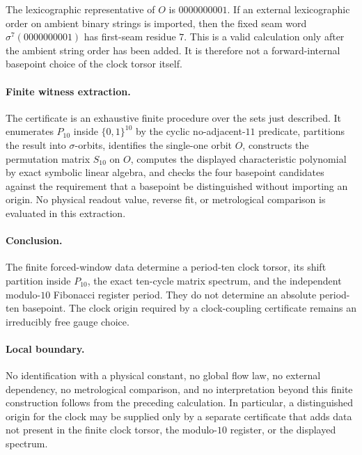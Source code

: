 The lexicographic representative of $O$ is $0000000001$. If an external lexicographic order on ambient binary strings is imported, then the fixed seam word $\sigma^7(0000000001)$ has first-seam residue $7$. This is a valid calculation only after the ambient string order has been added. It is therefore not a forward-internal basepoint choice of the clock torsor itself.

\paragraph{Finite witness extraction.}
The certificate is an exhaustive finite procedure over the sets just described. It enumerates $P_{10}$ inside $\{0,1\}^{10}$ by the cyclic no-adjacent-$11$ predicate, partitions the result into $\sigma$-orbits, identifies the single-one orbit $O$, constructs the permutation matrix $S_{10}$ on $O$, computes the displayed characteristic polynomial by exact symbolic linear algebra, and checks the four basepoint candidates against the requirement that a basepoint be distinguished without importing an origin. No physical readout value, reverse fit, or metrological comparison is evaluated in this extraction.

\paragraph{Conclusion.}
The finite forced-window data determine a period-ten clock torsor, its shift partition inside $P_{10}$, the exact ten-cycle matrix spectrum, and the independent modulo-$10$ Fibonacci register period. They do not determine an absolute period-ten basepoint. The clock origin required by a clock-coupling certificate remains an irreducibly free gauge choice.

\paragraph{Local boundary.}
No identification with a physical constant, no global flow law, no external dependency, no metrological comparison, and no interpretation beyond this finite construction follows from the preceding calculation. In particular, a distinguished origin for the clock may be supplied only by a separate certificate that adds data not present in the finite clock torsor, the modulo-$10$ register, or the displayed spectrum.
